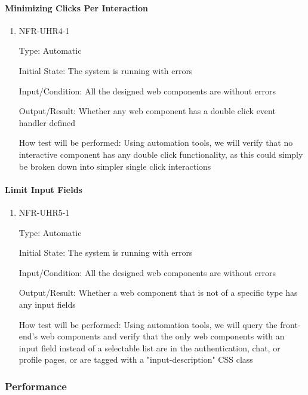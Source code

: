 \documentclass[12pt, titlepage]{article}
\begin{document}
\paragraph{Minimizing Clicks Per Interaction}

\begin{enumerate}

\item{NFR-UHR4-1\\}

Type: Automatic
					
Initial State: The system is running with errors
					
Input/Condition: All the designed web components are without errors
					
Output/Result: Whether any web component has a double click event handler defined
					
How test will be performed: Using automation tools, we will verify that no interactive component has any double click functionality, as this could simply be broken down into simpler single click interactions

\end{enumerate}

\paragraph{Limit Input Fields}

\begin{enumerate}

\item{NFR-UHR5-1\\}

Type: Automatic
					
Initial State: The system is running with errors
					
Input/Condition: All the designed web components are without errors
					
Output/Result: Whether a web component that is not of a specific type has any input fields
					
How test will be performed: Using automation tools, we will query the front-end's web components and verify that the only web components with an input field instead of a selectable list are in the authentication, chat, or profile pages, or are tagged with a "input-description" CSS class

\end{enumerate}

\subsubsection{Performance}
\end{document}
